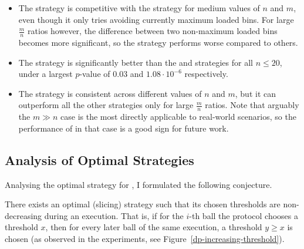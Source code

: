\begin{itemize}
    \item The \LocalRewardOptimiser strategy is competitive with the \DP strategy for medium values of $n$ and $m$, even though it only tries avoiding currently maximum loaded bins. For large $\frac{m}{n}$ ratios however, the difference between two non-maximum loaded bins becomes more significant, so the strategy performs worse compared to others.
    \item The \DQN strategy is significantly better than the \MeanThinning and \Threshold strategies for all $n\leq 20$, under a largest $p$-value of $0.03$ and $1.08\cdot 10^{-6}$ respectively.
    \item The \DQN strategy is consistent across different values of $n$ and $m$, but it can outperform all the other strategies only for large $\frac{m}{n}$ ratios. Note that arguably the $m\gg n$ case is the most directly applicable to real-world scenarios, so the performance of \DQL in that case is a good sign for future work.
\end{itemize}


\subsection{Analysis of Optimal Strategies}

Analysing the optimal \DP strategy for \TwoThinning, I formulated the following conjecture.

\begin{conjecture}\label{conjecture: two-thinning-increasing-threshold}
There exists an optimal (slicing) strategy such that its chosen thresholds are non-decreasing during an execution. That is, if for the $i$-th ball the protocol chooses a threshold $x$, then for every later ball of the same execution, a threshold $y\geq x$ is chosen (as observed in the experiments, see Figure~\ref{dp-increasing-threshold}).
\end{conjecture}


